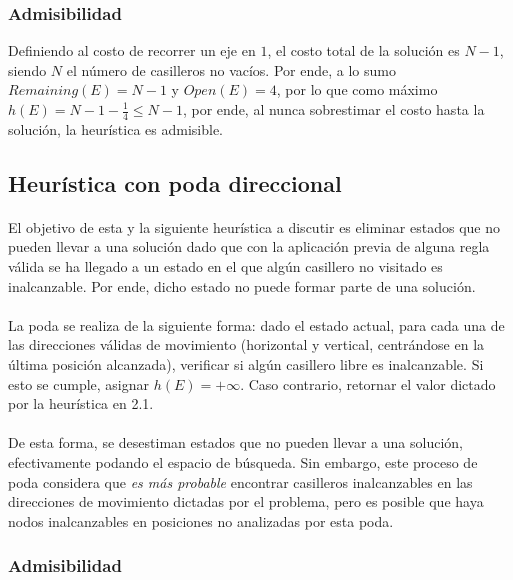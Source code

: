 \documentclass[12pt, twocolumn]{article}
\begin{document}
	\subsubsection{Admisibilidad}
	
	Definiendo al costo de recorrer un eje en $1$, el costo total de la solución es $N-1$, siendo $N$ el número de casilleros no vacíos. Por ende, a lo sumo $Remaining(E) = N-1$ y $Open(E) = 4$, por lo que como máximo $h(E) = N-1-\frac{1}{4} \le N-1$, por ende, al nunca sobrestimar el costo hasta la solución, la heurística es admisible. 

	\subsection{Heurística con poda direccional}
	
	\paragraph{} El objetivo de esta y la siguiente heurística a discutir es eliminar estados que no pueden llevar a una solución dado que con la aplicación previa de alguna regla válida se ha llegado a un estado en el que algún casillero no visitado es inalcanzable. Por ende, dicho estado no puede formar parte de una solución.
	
	\paragraph{} La poda se realiza de la siguiente forma: dado el estado actual, para cada una de las direcciones válidas de movimiento (horizontal y vertical, centrándose en la última posición alcanzada), verificar si algún casillero libre es inalcanzable. Si esto se cumple, asignar $h(E) = + \infty$. Caso contrario, retornar el valor dictado por la heurística en 2.1.
	
	\paragraph{} De esta forma, se desestiman estados que no pueden llevar a una solución, efectivamente podando el espacio de búsqueda. Sin embargo, este proceso de poda considera que \textit{es más probable} encontrar casilleros inalcanzables en las direcciones de movimiento dictadas por el problema, pero es posible que haya nodos inalcanzables en posiciones no analizadas por esta poda.
	
	\subsubsection{Admisibilidad}
	
\end{document}
